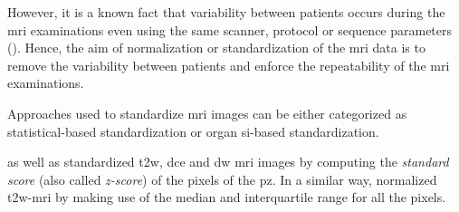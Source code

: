 \begin{enumerate}[leftmargin=*]
However, it is a known fact that variability between patients occurs during the \ac{mri} examinations even using the same scanner, protocol or sequence parameters (\cite{Nyul1999}). Hence, the aim of normalization or standardization of the \ac{mri} data is to remove the variability between patients and enforce the repeatability of the \ac{mri} examinations.

Approaches used to standardize \ac{mri} images can be either categorized as statistical-based standardization or organ \ac{si}-based standardization. 

\cite{Artan2009,Artan2010} as well as \cite{Ozer2009,Ozer2010} standardized \ac{t2w}, \ac{dce} and \ac{dw} \ac{mri} images by computing the \textit{standard score} (also called \textit{z-score}) of the pixels of the \ac{pz}. %
%
%
%
In a similar way, \cite{Liu2013} normalized \ac{t2w}-\ac{mri} by making use of the median and interquartile range for all the pixels.
%
%


\end{enumerate}
